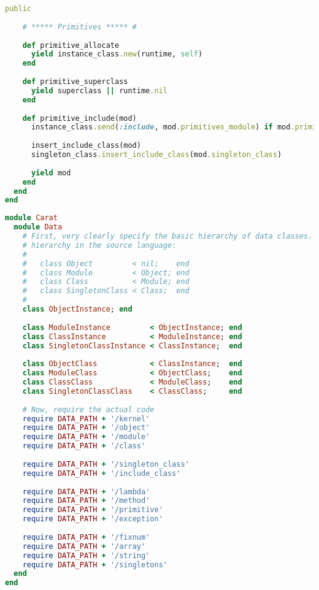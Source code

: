 \begin{lstlisting}[title={\small\ttfamily\bfseries data/class.rb},language=Ruby]
    public
    
    # ***** Primitives ***** #
    
    def primitive_allocate
      yield instance_class.new(runtime, self)
    end
    
    def primitive_superclass
      yield superclass || runtime.nil
    end
    
    def primitive_include(mod)
      instance_class.send(:include, mod.primitives_module) if mod.primitives_module
      
      insert_include_class(mod)
      singleton_class.insert_include_class(mod.singleton_class)
      
      yield mod
    end
  end
end

\end{lstlisting}
\begin{lstlisting}[title={\small\ttfamily\bfseries data/data.rb},language=Ruby]
module Carat
  module Data
    # First, very clearly specify the basic hierarchy of data classes. This mirrors the inheritance
    # hierarchy in the source language:
    # 
    #   class Object         < nil;    end
    #   class Module         < Object; end
    #   class Class          < Module; end
    #   class SingletonClass < Class;  end
    # 
    class ObjectInstance; end
    
    class ModuleInstance         < ObjectInstance; end
    class ClassInstance          < ModuleInstance; end
    class SingletonClassInstance < ClassInstance;  end
    
    class ObjectClass            < ClassInstance;  end
    class ModuleClass            < ObjectClass;    end
    class ClassClass             < ModuleClass;    end
    class SingletonClassClass    < ClassClass;     end
    
    # Now, require the actual code
    require DATA_PATH + '/kernel'
    require DATA_PATH + '/object'
    require DATA_PATH + '/module'
    require DATA_PATH + '/class'
    
    require DATA_PATH + '/singleton_class'
    require DATA_PATH + '/include_class'
    
    require DATA_PATH + '/lambda'
    require DATA_PATH + '/method'
    require DATA_PATH + '/primitive'
    require DATA_PATH + '/exception'
    
    require DATA_PATH + '/fixnum'
    require DATA_PATH + '/array'
    require DATA_PATH + '/string'
    require DATA_PATH + '/singletons'
  end
end

\end{lstlisting}
